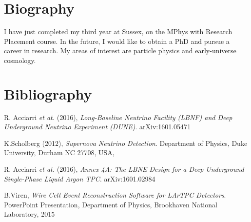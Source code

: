 \documentclass[a4paper,12,oneside,notitlepage]{report}
\begin{document}
\section*{\fontsize{11}{11}\selectfont Biography}
I have just completed my third year at Sussex, on the MPhys with Research Placement course. In the future, I would like to obtain a PhD and pursue a career in research. My areas of interest are particle physics and early-universe cosmology.


\newpage
\section*{\fontsize{11}{11}\selectfont Bibliography}
\begin{thebibliography}{20}

	R. Acciarri \textit{et at.} (2016),
	\emph{Long-Baseline Neutrino Facility (LBNF) and
Deep Underground Neutrino Experiment (DUNE)}.
	arXiv:1601.05471
		 
	K.Scholberg (2012),
	\emph{Supernova Neutrino Detection}.
	Department of Physics, 
	Duke University, Durham NC 27708, USA,
	
	R. Acciarri \textit{et at.} (2016),
	\emph{Annex 4A: The LBNE Design for a Deep
Underground Single-Phase Liquid Argon TPC}.
	 arXiv:1601.02984
	
	B.Viren,
	\emph{Wire Cell Event Reconstruction Software
for LArTPC Detectors}.
	PowerPoint Presentation,
	Department of Physics,
	Brookhaven National Laboratory,
	2015	

\end{thebibliography}
\end{document}
